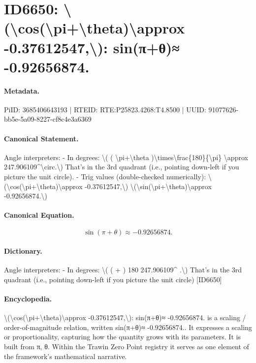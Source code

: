\section*{ID6650: \textbackslash{}(\textbackslash{}cos(\textbackslash{}pi+\textbackslash{}theta)\textbackslash{}approx -0.37612547,\textbackslash{}): sin(π+θ)≈ -0.92656874.}
\paragraph{Metadata.}
PiID: 3685406643193 | RTEID: RTE:P25823.4268:T4.8500 | UUID: 91077626-bb5e-5a09-8227-cf8c4e3a6369

\paragraph{Canonical Statement.}
Angle interpreters: - In degrees: \textbackslash{}( ( \textbackslash{}pi+\textbackslash{}theta )\textbackslash{}times\textbackslash{}frac\{180\}\{\textbackslash{}pi\} \textbackslash{}approx 247.906109\textasciicircum{}\textbackslash{}circ.\textbackslash{}) That’s in the 3rd quadrant (i.e., pointing down-left if you picture the unit circle). - Trig values (double-checked numerically): \textbackslash{}(\textbackslash{}cos(\textbackslash{}pi+\textbackslash{}theta)\textbackslash{}approx -0.37612547,\textbackslash{}) \textbackslash{}(\textbackslash{}sin(\textbackslash{}pi+\textbackslash{}theta)\textbackslash{}approx -0.92656874.\textbackslash{})

\paragraph{Canonical Equation.}
\[
\sin(\pi+\theta)\approx -0.92656874.
\]

\paragraph{Dictionary.}
Angle interpreters: - In degrees: \textbackslash{}( ( + ) 180 247.906109\textasciicircum{} .\textbackslash{}) That’s in the 3rd quadrant (i.e., pointing down-left if you picture the unit circle) [ID6650]

\paragraph{Encyclopedia.}
\textbackslash{}(\textbackslash{}cos(\textbackslash{}pi+\textbackslash{}theta)\textbackslash{}approx -0.37612547,\textbackslash{}): sin(π+θ)≈ -0.92656874. is a scaling / order-of-magnitude relation, written sin(π+θ)≈ -0.92656874.. It expresses a scaling or proportionality, capturing how the quantity grows with its parameters. It is built from π, θ. Within the Trawin Zero Point registry it serves as one element of the framework's mathematical narrative.
